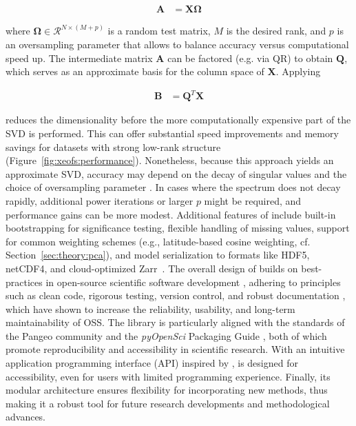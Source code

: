 \begin{align*}
    \bm{A} &= \bm{X} \bm{\Omega}
\end{align*}

where $\bm{\Omega} \in \mathcal{R}^{N \times (M+p)}$ is a random test matrix, $M$ is the desired rank, and $p$ is an oversampling parameter that allows to balance accuracy versus computational speed up. The intermediate matrix $\bm{A}$ can be factored (e.g. via QR) to obtain $\bm{Q}$, which serves as an approximate basis for the column space of $\bm{X}$. Applying

\begin{align}
    \bm{B} &= \bm{Q}^T \bm{X}
\end{align}

reduces the dimensionality before the more computationally expensive part of the SVD is performed. This can offer substantial speed improvements and memory savings for datasets with strong low-rank structure (Figure~\ref{fig:xeofs:performance}). Nonetheless, because this approach yields an approximate SVD, accuracy may depend on the decay of singular values and the choice of oversampling parameter \cite{halko_finding_2011}. In cases where the spectrum does not decay rapidly, additional power iterations or larger $p$ might be required, and performance gains can be more modest.
Additional features of  include built-in bootstrapping for significance testing, flexible handling of missing values, support for common weighting schemes (e.g., latitude-based cosine weighting, cf. Section~\ref{sec:theory:pca}), and model serialization to formats like HDF5, netCDF4, and cloud-optimized Zarr~\cite{alistair_miles_2020_3773450}. The overall design of  builds on best-practices in open-source scientific software development \cite{prlic_ten_2012,balaban_ten_2021}, adhering to principles such as clean code, rigorous testing, version control, and robust documentation \cite{perez-riverol_ten_2016,list_ten_2017,taschuk_ten_2017,lee_ten_2018,hunter-zinck_ten_2021}, which have shown to increase the reliability, usability, and long-term maintainability \cite{list_ten_2017} of OSS. The library is particularly aligned with the standards of the Pangeo community \cite{pangeo} and the \textit{pyOpenSci} Packaging Guide \cite{wasser_pyopenscipython-package-guide_2024}, both of which promote reproducibility and accessibility in scientific research. With an intuitive application programming interface (API) inspired by  \cite{scikit-learn},  is designed for accessibility, even for users with limited programming experience. Finally, its modular architecture ensures flexibility for incorporating new methods, thus making it a robust tool for future research developments and methodological advances.


